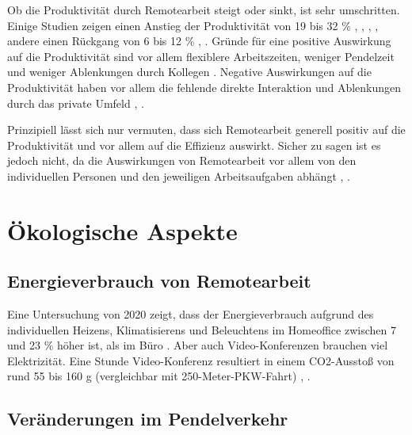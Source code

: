 \documentclass[runningheads]{llncs}
\begin{document}
Ob die Produktivität durch Remotearbeit steigt oder sinkt, ist sehr umschritten.
Einige Studien zeigen einen Anstieg der Produktivität von 19 bis 32 \% \cite{capgemini_research_institute_future_2020}, \cite{glenn_dutcher_effects_2012}, \cite{owl_labs_state_2022}, \cite{global_workplace_analytics_latest_2021}, andere einen Rückgang von 6 bis 12 \% \cite{emanuel_working_2023}, \cite{steven_j_davis_evolution_2023}.
Gründe für eine positive Auswirkung auf die Produktivität sind vor allem flexiblere Arbeitszeiten, weniger Pendelzeit und weniger Ablenkungen durch Kollegen \cite{capgemini_research_institute_future_2020}.
Negative Auswirkungen auf die Produktivität haben vor allem die fehlende direkte Interaktion und Ablenkungen durch das private Umfeld \cite{holand_homeoffice_2023}, \cite{emanuel_working_2023}.

Prinzipiell lässt sich nur vermuten, dass sich Remotearbeit generell positiv auf die Produktivität und vor allem auf die Effizienz auswirkt.
Sicher zu sagen ist es jedoch nicht, da die Auswirkungen von Remotearbeit vor allem von den individuellen Personen und den jeweiligen Arbeitsaufgaben abhängt \cite{glenn_dutcher_effects_2012}, \cite{holand_homeoffice_2023}.

\section{Ökologische Aspekte}


\subsection{Energieverbrauch von Remotearbeit}

Eine Untersuchung von 2020 zeigt, dass der Energieverbrauch aufgrund des individuellen Heizens, Klimatisierens und Beleuchtens im Homeoffice zwischen 7 und 23 \% höher ist, als im Büro \cite{daniel_crow_working_2022}.
Aber auch Video-Konferenzen brauchen viel Elektrizität. 
Eine Stunde Video-Konferenz resultiert in einem CO2-Ausstoß von rund 55 bis 160 g (vergleichbar mit 250-Meter-PKW-Fahrt) \cite{deutschlandfunk_nova_internet-konferenz_2021}, \cite{eisemann_treibhauseffekt_2021}.

\subsection{Veränderungen im Pendelverkehr}
\end{document}
